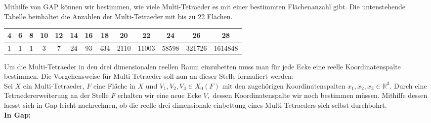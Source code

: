 \documentclass[12pt,titlepage,twoside,cleardoublepage]{article}
\theoremstyle{nummermitklammern}
\numberwithin{equation}{section}
\begin{document}
Mithilfe von GAP können wir bestimmen, wie viele Multi-Tetraeder es mit einer bestimmten Flächenanzahl gibt.
Die untenstehende Tabelle beinhaltet die Anzahlen der Multi-Tetraeder mit bis zu 22 Flächen.
\begin{center}
\begin{tabular}[h]{|c|c|c|c|c|c|c|c|c|c|c|c|c|}
\hline
\textbf{ 4} &  \textbf{6}& \textbf{8} &\textbf{ 10} &\textbf{ 12} & \textbf{14}&\textbf{16}&\textbf{18}&\textbf{20}&\textbf{22}&\textbf{24}&\textbf{26}&\textbf{28}\\
\hline
 1& 1& 1& 3& 7& 24& 93& 434& 2110& 11003& 58598& 321726& 1614848
 \\
 \hline
\end{tabular}
\end{center}
Um die Multi-Tetraeder in den drei dimensionalen reellen Raum einzubetten muss man für jede Ecke eine reelle Koordinatenspalte bestimmen. Die Vorgehensweise für Multi-Tetraeder soll nun an dieser Stelle formuliert werden:\\
Sei $X$ ein Multi-Tetraeder, $F$ eine Fläche in $X$ und $V_1,V_2,V_3\in X_0(F)$ mit den zugehörigen Koordinatenspalten $x_1,x_2,x_3\in \mathbb{R}^3.$ Durch eine Tetraedererweiterung an der Stelle $F$ erhalten wir eine neue Ecke $V,$ dessen Koordinatenspalte wir noch bestimmen müssen.
Mithilfe dessen laesst sich in Gap leicht nachrechnen, ob die reelle drei-dimensionale einbettung eines Multi-Tetraeders sich selbst durchbohrt.\\
\textbf{In Gap:}
\end{document}
